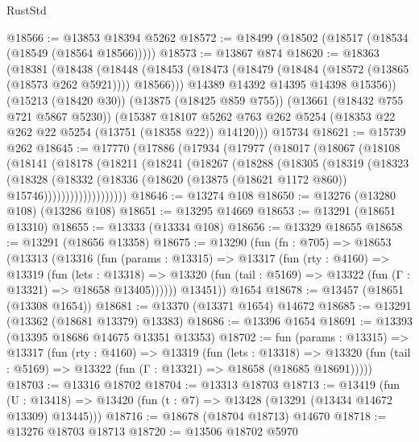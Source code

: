 \begin{lexlean}{RustStd}
\begin{coremodule}
@18566 := @13853 @18394 @5262
@18572 := @18499 (@18502 (@18517 (@18534 (@18549 (@18564 @18566)))))
@18573 := @13867 @874
@18620 := @18363
    (@18381
      (@18438
        (@18448
          (@18453 (@18473 (@18479 (@18484 (@18572 (@13865 (@18573 @262 @5921)))) @18566)))
          @14389
          @14392
          @14395
          @14398
          @15356))
      (@15213 (@18420 @30))
      (@13875 (@18425 @859 @755))
      (@13661 (@18432 @755 @721 @5867 @5230))
      (@15387
        @18107
        @5262
        @763
        @262
        @5254
        (@18353 @22 @262 @22 @5254 (@13751 (@18358 @22)) @14120)))
    @15734
@18621 := @15739 @262
@18645 := @17770
    (@17886
      (@17934
        (@17977
          (@18017
            (@18067
              (@18108
                (@18141
                  (@18178
                    (@18211
                      (@18241
                        (@18267
                          (@18288
                            (@18305
                              (@18319
                                (@18323
                                  (@18328
                                    (@18332
                                      (@18336
                                        (@18620
                                          (@13875 (@18621 @1172 @860))
                                          @15746)))))))))))))))))))
@18646 := @13274 @108
@18650 := @13276 (@13280 @108) (@13286 @108)
@18651 := @13295 @14669
@18653 := @13291 (@18651 @13310)
@18655 := @13333 (@13334 @108)
@18656 := @13329 @18655
@18658 := @13291 (@18656 @13358)
@18675 := @13290
    (fun (fn : @705) =>
    @18653
      (@13313
        (@13316
          (fun (params : @13315) =>
          @13317
            (fun (rty : @4160) =>
            @13319
              (fun (lets : @13318) =>
              @13320 (fun (tail : @5169) => @13322 (fun (Γ : @13321) => @18658 @13405))))))
        @13451))
    @1654
@18678 := @13457 (@18651 (@13308 @1654))
@18681 := @13370 (@13371 @1654) @14672
@18685 := @13291 (@13362 (@18681 @13379) @13383)
@18686 := @13396 @1654
@18691 := @13393 (@13395 @18686 @14675 @13351 @13353)
@18702 := fun (params : @13315) =>
  @13317
    (fun (rty : @4160) =>
    @13319
      (fun (lets : @13318) =>
      @13320 (fun (tail : @5169) => @13322 (fun (Γ : @13321) => @18658 (@18685 @18691)))))
@18703 := @13316 @18702
@18704 := @13313 @18703
@18713 := @13419
    (fun (U : @13418) => @13420 (fun (t : @7) => @13428 (@13291 (@13434 @14672 @13309) @13445)))
@18716 := @18678 (@18704 @18713) @14670
@18718 := @13276 @18703 @18713
@18720 := @13506 @18702 @5970

\end{coremodule}
\end{lexlean}
